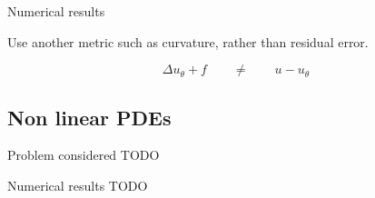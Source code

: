 \begin{frame}{Numerical results}
\begin{minipage}{0.86\linewidth}
        \vspace{5pt}
        Use another metric such as curvature, rather than residual error.

        \vspace{-5pt}
        $$\Delta u_\theta+f \qquad \ne \qquad u-u_\theta$$
    \end{minipage}


\end{frame}

\subsection{\filledstar Non linear PDEs}

\begin{frame}{Problem considered}	
    TODO



\end{frame}

\begin{frame}{Numerical results}	
    TODO
\end{frame}